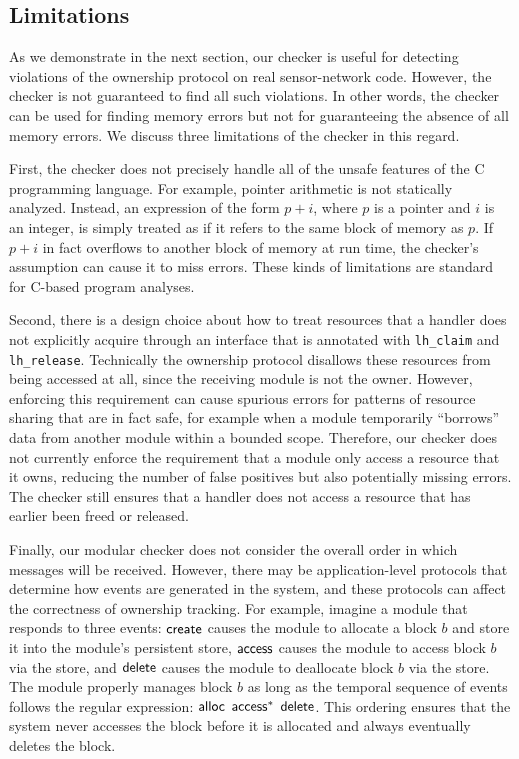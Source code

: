 \subsection{Limitations}

As we demonstrate in the next section, our checker is useful for
detecting violations of the ownership protocol on real sensor-network
code.  However, the checker is not guaranteed to find all such
violations.  In other words, the checker can be used for finding
memory errors but not for guaranteeing the absence of all memory
errors.  We discuss three limitations of the checker in this regard.

First, the checker does not precisely handle all of the unsafe
features of the C programming language.  For example, pointer
arithmetic is not statically analyzed.  Instead, an expression of the
form $p+i$, where $p$ is a pointer and $i$ is an integer, is simply
treated as if it refers to the same block of memory as $p$.  If $p+i$
in fact overflows to another block of memory at run time, the
checker's assumption can cause it to miss errors.  These kinds of
limitations are standard for C-based program analyses.

Second, there is a design choice about how to treat resources that a
handler does not explicitly acquire through an interface that is
annotated with {\tt lh\_claim} and {\tt lh\_release}.  Technically the
ownership protocol disallows these resources from being accessed at
all, since the receiving module is not the owner.  However, enforcing
this requirement can cause spurious errors for patterns of resource
sharing that are in fact safe, for example when a module temporarily
``borrows'' data from another module within a bounded scope.
Therefore, our checker does not currently enforce the requirement that
a module only access a resource that it owns, reducing the number of
false positives but also potentially missing errors.  The checker
still ensures that a handler does not access a resource that has
earlier been freed or released.

Finally, our modular checker does not consider the overall order in
which messages will be received.  However, there may be
application-level protocols that determine how events are generated in
the system, and these protocols can affect the correctness of
ownership tracking.
%
For example, imagine a module that responds to three events: ${\mathsf{create}}$
causes the module to allocate a block $b$ and store it into the
module's persistent store, ${\mathsf{access}}$ causes the module to access block
$b$ via the  store, and ${\mathsf{delete}}$ causes the module to deallocate
block $b$ via the store.  The module properly manages block $b$ as
long as the temporal sequence of events follows the regular expression:
${\mathsf{alloc}}$ ${\mathsf{access}}^*$ ${\mathsf{delete}}$.  This ordering ensures that the system
never accesses the block before it is allocated and always eventually
deletes the block.

